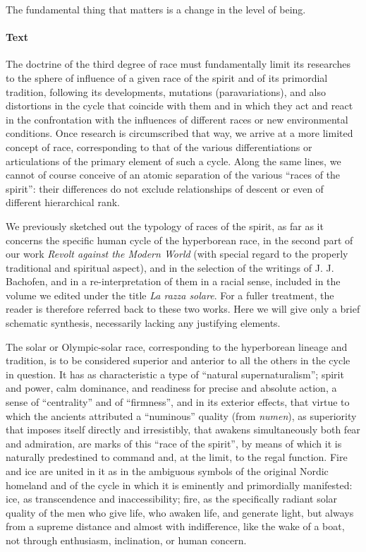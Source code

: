 The fundamental thing that matters is a change in the level of being.

\paragraph{Text}


The doctrine of the third degree of race must fundamentally limit its researches to the sphere of influence of a given race of the spirit and of its primordial tradition, following its developments, mutations (paravariations), and also distortions in the cycle that coincide with them and in which they act and react in the confrontation with the influences of different races or new environmental conditions. Once research is circumscribed that way, we arrive at a more limited concept of race, corresponding to that of the various differentiations or articulations of the primary element of such a cycle. Along the same lines, we cannot of course conceive of an atomic separation of the various ``races of the spirit'': their differences do not exclude relationships of descent or even of different hierarchical rank.

We previously sketched out the typology of races of the spirit, as far as it concerns the specific human cycle of the hyperborean race, in the second part of our work \emph{Revolt against the Modern World} (with special regard to the properly traditional and spiritual aspect), and in the selection of the writings of J. J. Bachofen, and in a re-interpretation of them in a racial sense, included in the volume we edited under the title \emph{La razza solare}. For a fuller treatment, the reader is therefore referred back to these two works. Here we will give only a brief schematic synthesis, necessarily lacking any justifying elements.

The solar or Olympic-solar race, corresponding to the hyperborean lineage and tradition, is to be considered superior and anterior to all the others in the cycle in question. It has as characteristic a type of ``natural supernaturalism''; spirit and power, calm dominance, and readiness for precise and absolute action, a sense of ``centrality'' and of ``firmness'', and in its exterior effects, that virtue to which the ancients attributed a ``numinous'' quality (from \emph{numen}), as superiority that imposes itself directly and irresistibly, that awakens simultaneously both fear and admiration, are marks of this ``race of the spirit'', by means of which it is naturally predestined to command and, at the limit, to the regal function. Fire and ice are united in it as in the ambiguous symbols of the original Nordic homeland and of the cycle in which it is eminently and primordially manifested: ice, as transcendence and inaccessibility; fire, as the specifically radiant solar quality of the men who give life, who awaken life, and generate light, but always from a supreme distance and almost with indifference, like the wake of a boat, not through enthusiasm, inclination, or human concern.

